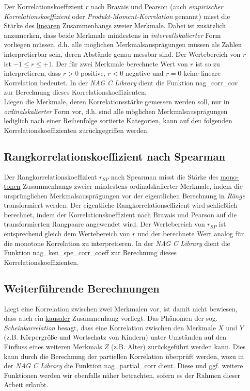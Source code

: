 \documentclass{article}
\begin{document}
Der Korrelationskoeffizient $r$ nach Bravais und Pearson (auch {\it empirischer Korrelationskoeffizient} oder {\it Produkt-Moment-Korrelation} genannt) misst die Stärke des \underline{linearen} Zusammenhangs zweier Merkmale. Dabei ist zusätzlich anzumerken, dass beide Merkmale mindestens in {\it intervallskalierter} Form vorliegen müssen, d.h. alle möglichen Merkmalsausprägungen müssen als Zahlen interpretierbar sein, deren Abstände genau messbar sind. Der Wertebereich von $r$ ist $-1 \leq r \leq +1$. Der für zwei Merkmale berechnete Wert von $r$ ist so zu interpretieren, dass $r > 0$ positive, $r < 0$ negative und $r = 0$ keine lineare Korrelation bedeutet. In der {\it NAG C Library} dient die Funktion nag\_corr\_cov zur Berechnung dieses Korrelationskoeffizienten.\\
Liegen die Merkmale, deren Korrelationsstärke gemessen werden soll, nur in {\it ordinalskalierter} Form vor, d.h. sind alle möglichen Merkmalsausprägungen lediglich nach einer Reihenfolge sortierte Kategorien, kann auf den folgenden Korrelationskoeffizienten zurückgegriffen werden.

\subsection{Rangkorrelationskoeffizient nach Spearman}

Der Rangkorrelationskoeffizient $r_{SP}$ nach Spearman misst die Stärke des \underline{mono-}\\\underline{tonen} Zusammenhangs zweier mindestens ordinalskalierter Merkmale, indem die ursprünglichen Merkmalsausprägungen vor der eigentlichen Berechnung in {\it Ränge} transformiert werden. Der eigentliche Rangkorrelationseffizient wird schließlich berechnet, indem der Korrelationskoeffizient nach Bravais und Pearson auf die transformierten Rangpaare angewendet wird. Der Wertebereich von $r_{SP}$ ist entsprechend gleich dem Wertebereich von $r$ und der berechnete Wert analog für die monotone Korrelation zu interpretieren. In der {\it NAG C Library} dient die Funktion nag\_ken\_spe\_corr\_coeff zur Berechnung dieses Korrelationskoeffizienten.

\subsection{Weiterführende Berechnungen}

Liegt eine Korrelation zwischen zwei Merkmalen vor, ist damit nicht bewiesen, dass auch ein \underline{kausaler} Zusammenhang vorliegt. Das Phänomen der sog. {\it Scheinkorrelation} besagt, dass eine Korrelation zwischen den Merkmale $X$ und $Y$ (z.B. Körpergröße und Wortschatz von Kindern) unter Umständen auf den Einfluss eines weiteren Merkmals $Z$ (z.B. Alter) zurückgeführt werden kann. Dies kann durch die Berechnung der partiellen Korrelation überprüft werden, wozu in der {\it NAG C Library} die Funktion nag\_partial\_corr dient. Diese und ggf. weitere Funktionen werden wir ebenfalls näher betrachten, sofern es der Rahmen dieser Arbeit erlaubt.
\end{document}
